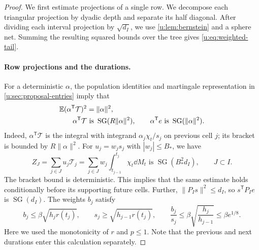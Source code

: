 \begin{proof}
We first estimate projections of a single row. We decompose each
triangular projection by dyadic depth and separate its half diagonal.
After dividing each interval projection by $\sqrt{d_I}$, we use
\cref{u:lem:bernstein} and a sphere net. Summing the resulting squared
bounds over the tree gives \eqref{u:eq:weighted-tail}.

\paragraph{Row projections and the durations.}
For a deterministic $\alpha$, the population identities and martingale
representation in \cref{u:sec:proposal-entries} imply that
\begin{equation}\label{u:eq:row-projections}
\begin{aligned}
 \mathbb E(\alpha^{\mathsf T}\mathcal T)^2&=\|\alpha\|^2,\\
 \alpha^{\mathsf T}\mathcal T&\text{ is }
       \operatorname{SG}(R\|\alpha\|^2),\qquad
 \alpha^{\mathsf T}e\text{ is }
       \operatorname{SG}(\|\alpha\|^2).
\end{aligned}
\end{equation}
Indeed, $\alpha^{\mathsf T}\mathcal T$ is the integral with integrand
$\alpha_j\chi_t/s_j$ on previous cell $j$; its bracket is bounded by
$R\|\alpha\|^2$. For $u_j=w_js_j$ with $|w_j|\le B_*$, we have
\begin{equation}\label{u:eq:weighted-row-increments}
 Z_J=\sum_{j\in J}u_j\mathcal T_j
 =\sum_{j\in J}w_j\int_{t_{j-1}}^{t_j}\chi_t\dd M_t
 \text{ is }\operatorname{SG}(B_*^2d_I),\qquad J\subset I.
\end{equation}
The bracket bound is deterministic. This implies that the same estimate
holds conditionally before its supporting future cells. Further,
$\|P_Is\|^2\le d_I$, so $s^{\mathsf T}P_Ie$ is
$\operatorname{SG}(d_I)$. The weights $b_j$ satisfy
\begin{equation}\label{u:eq:adjacent-duration-weights}
 b_j\le\beta\sqrt{h_jr(t_j)},\qquad
 s_j\ge\sqrt{h_{j-1}r(t_j)},\qquad
 \frac{b_j}{s_j}\le\beta\sqrt{\frac{h_j}{h_{j-1}}}
 \le\beta e^{1/8}.
\end{equation}
Here we used the monotonicity of $r$ and $p\le1$. Note that the
previous and next durations enter this calculation separately.


\end{proof}
